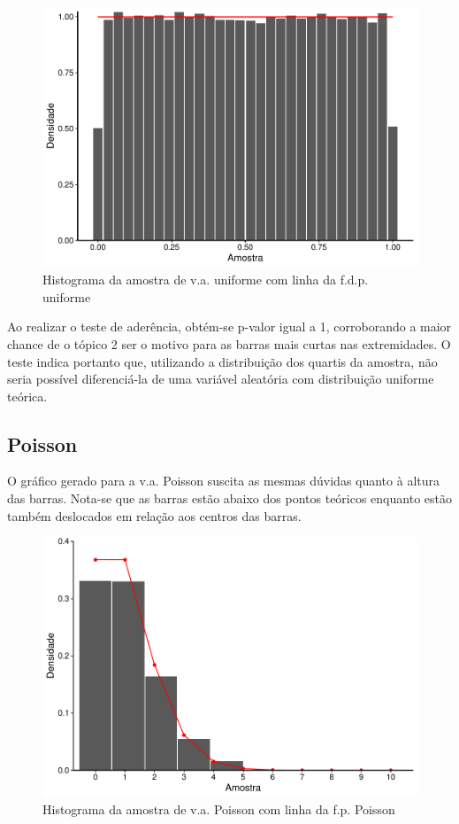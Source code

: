 \documentclass[
]{article}
\begin{document}
\begin{figure}

{\centering \includegraphics[width=0.7\linewidth]{relatorio_tp2_files/figure-latex/resultados-unif-1} 

}

\caption{Histograma da amostra de v.a. uniforme com linha da f.d.p. uniforme}\label{fig:resultados-unif}
\end{figure}

Ao realizar o teste de aderência, obtém-se p-valor igual a 1,
corroborando a maior chance de o tópico 2 ser o motivo para as barras
mais curtas nas extremidades. O teste indica portanto que, utilizando a
distribuição dos quartis da amostra, não seria possível diferenciá-la de
uma variável aleatória com distribuição uniforme teórica.

\hypertarget{poisson}{%
\subsection{Poisson}\label{poisson}}

O gráfico gerado para a v.a. Poisson suscita as mesmas dúvidas quanto à
altura das barras. Nota-se que as barras estão abaixo dos pontos
teóricos enquanto estão também deslocados em relação aos centros das
barras.

\begin{figure}

{\centering \includegraphics[width=0.7\linewidth]{relatorio_tp2_files/figure-latex/resultados-pois-1} 

}

\caption{Histograma da amostra de v.a. Poisson com linha da f.p. Poisson}\label{fig:resultados-pois}
\end{figure}
\end{document}
